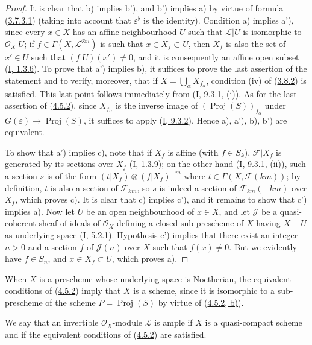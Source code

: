 \begin{proof}
It is clear that b) implies b'), and b') implies a) by virtue of formula
(\hyperref[II.3.7.3.1]{3.7.3.1}) (taking into account that
$\varepsilon^\flat$ is the identity). Condition a) implies a'), since every
$x\in X$ has an affine neighbourhood $U$ such that
$\mathcal{L}|U$ is isomorphic to $\mathcal{O}_X|U$; if
$f\in\Gamma(X,\mathcal{L}^{\otimes n})$ is such that $x\in X_f\subset U$,
then $X_f$ is also the set of $x'\in U$ such that $(f|U)(x')\neq0$, and it is
consequently an affine open subset (\hyperref[I.1.3.6]{I, 1.3.6}). To prove
that a') implies b), it suffices to prove the last assertion of the statement
and to verify, moreover, that if $X=\bigcup_\alpha X_{f_\alpha}$, condition
(iv) of (\hyperref[II.3.8.2]{3.8.2}) is satisfied. This last point
follows immediately from (\hyperref[I.9.3.1]{I, 9.3.1, (i)}). As for the
last assertion of (\hyperref[II.4.5.2]{4.5.2}), since
$X_{f_\alpha}$ is the inverse image of
$(\operatorname{Proj}(S))_{f_\alpha}$ under
$G(\varepsilon)\to\operatorname{Proj}(S)$, it suffices to apply
(\hyperref[I.9.3.2]{I, 9.3.2}). Hence a), a'), b), b') are equivalent.

To show that a') implies c), note that if $X_f$ is affine (with
$f\in S_k$), $\mathcal{F}|X_f$ is generated by its sections over
$X_f$ (\hyperref[I.1.3.9]{I, 1.3.9}); on the other hand
(\hyperref[I.9.3.1]{I, 9.3.1, (ii)}), such a section $s$ is of the form
$(t|X_f)\otimes(f|X_f)^{-m}$ where
$t\in\Gamma(X,\mathcal{F}(km))$; by definition, $t$ is also a section
of $\mathcal{F}_{km}$, so $s$ is indeed a section of
$\mathcal{F}_{km}(-km)$ over $X_f$, which proves c). It is clear
that c) implies c'), and it remains to show that c') implies a). Now let $U$
be an open neighbourhood of $x\in X$, and let $\mathcal{J}$ be a quasi-coherent
sheaf of ideals of $\mathcal{O}_X$ defining a closed sub-prescheme of $X$
having $X-U$ as underlying space
(\hyperref[I.5.2.1]{I, 5.2.1}). Hypothesis c') implies that there exist an
integer $n>0$ and a section $f$ of $\mathcal{J}(n)$ over $X$ such
that $f(x)\neq0$. But we evidently have $f\in S_n$, and $x\in X_f\subset U$,
which proves a).
\end{proof}

When $X$ is a prescheme whose underlying space is Noetherian, the
equivalent conditions of (\hyperref[II.4.5.2]{4.5.2}) imply that
$X$ is a scheme, since it is isomorphic to a sub-prescheme of the scheme
$P=\operatorname{Proj}(S)$ by virtue of
(\hyperref[II.4.5.2]{4.5.2, b)}).

\begin{definition}[4.5.3]
\label{II.4.5.3}
We say that an invertible $\mathcal{O}_X$-module $\mathcal{L}$ is ample if
$X$ is a quasi-compact scheme and if the equivalent conditions of
(\hyperref[II.4.5.2]{4.5.2}) are satisfied.
\end{definition}

